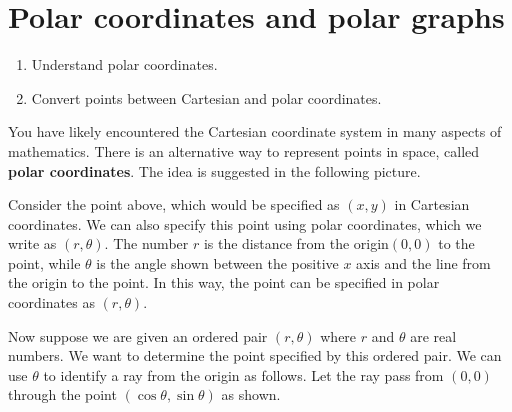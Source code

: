 \section{Polar coordinates and polar graphs}

\begin{outcome}
  \begin{enumerate}
  \item Understand polar coordinates.
  \item Convert points between Cartesian and polar coordinates.
  \end{enumerate}
\end{outcome}

You have likely encountered the Cartesian coordinate system in many aspects of mathematics. There is an alternative way to represent points in space, called \textbf{polar
coordinates}. The idea is suggested in the following picture.

\begin{center}
\end{center}

Consider the point above, which would be specified as $(x,y)$ in Cartesian coordinates. We can also specify this point using polar coordinates, which we write as $(r, \theta)$. The number $r$ is the distance from the origin$(0,0)$ to the point, while $\theta $ is the angle shown
between the positive $x$ axis and the line from the origin to the point. In this way, the point can be specified in polar coordinates as $(r, \theta)$.

Now suppose we are given an ordered pair $(r,\theta) $ where 
$r$ and $\theta$ are real numbers. We want to determine the point specified by this ordered pair. We can use $\theta $ to identify a ray
from the origin as follows. Let the ray pass from $(0,0) $
through the point $(\cos \theta ,\sin \theta) $ as shown.

\begin{center}
\end{center}


